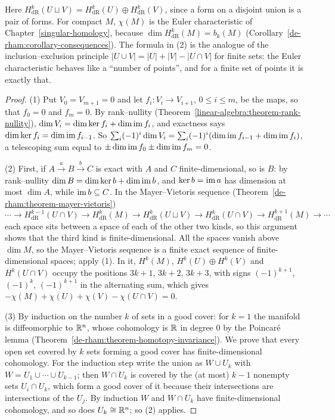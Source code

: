 Here $H^k_{\mathrm{dR}}(U \sqcup V) = H^k_{\mathrm{dR}}(U) \oplus H^k_{\mathrm{dR}}(V)$, since a form on a disjoint union is a pair of forms. For compact $M$, $\chi(M)$ is the Euler characteristic of
Chapter~\ref{singular-homology}, because $\dim H^k_{\mathrm{dR}}(M) = b_k(M)$ (Corollary~\ref{de-rham:corollary-consequences}). The formula in (2) is the analogue of the inclusion--exclusion principle
$|U \cup V| = |U| + |V| - |U \cap V|$ for finite sets: the Euler characteristic behaves like a ``number of points'', and for a finite set of points it is exactly that.

\begin{proof}
(1) Put $V_0 = V_{m+1} = 0$ and let $f_i \colon V_i \to V_{i+1}$, $0 \leq i \leq m$, be the maps, so that $f_0 = 0$ and $f_m = 0$. By rank--nullity (Theorem~\ref{linear-algebra:theorem-rank-nullity}), $\dim V_i = \dim\ker f_i + \dim\operatorname{im} f_i$, and exactness says
$\dim\ker f_i = \dim\operatorname{im} f_{i-1}$. So $\sum_i(-1)^i\dim V_i = \sum_i(-1)^i(\dim\operatorname{im} f_{i-1} + \dim\operatorname{im} f_i)$, a telescoping sum equal to $\pm\dim\operatorname{im} f_0 \pm \dim\operatorname{im} f_m = 0$.

(2) First, if $A \xrightarrow{a} B \xrightarrow{b} C$ is exact with $A$ and $C$ finite-dimensional, so is $B$: by rank--nullity $\dim B = \dim\ker b + \dim\operatorname{im} b$, and $\ker b = \operatorname{im} a$ has dimension at most $\dim A$,
while $\operatorname{im} b \subseteq C$. In the Mayer--Vietoris sequence (Theorem~\ref{de-rham:theorem-mayer-vietoris})
\[
\cdots \to H^{k-1}_{\mathrm{dR}}(U \cap V) \to H^k_{\mathrm{dR}}(M) \to H^k_{\mathrm{dR}}(U \sqcup V) \to H^k_{\mathrm{dR}}(U \cap V) \to H^{k+1}_{\mathrm{dR}}(M) \to \cdots
\]
each space sits between a space of each of the other two kinds, so this argument shows that the third kind is finite-dimensional. All the spaces vanish above $\dim M$, so the Mayer--Vietoris sequence is a finite exact
sequence of finite-dimensional spaces; apply (1). In it, $H^k(M)$, $H^k(U) \oplus H^k(V)$ and $H^k(U \cap V)$ occupy the positions $3k + 1$, $3k + 2$, $3k + 3$, with signs $(-1)^{k+1}$, $(-1)^k$, $(-1)^{k+1}$ in
the alternating sum, which gives $-\chi(M) + \chi(U) + \chi(V) - \chi(U \cap V) = 0$.

(3) By induction on the number $k$ of sets in a good cover: for $k = 1$ the manifold is diffeomorphic to $\mathbb{R}^n$, whose cohomology is $\mathbb{R}$ in degree $0$ by the Poincar\'e lemma
(Theorem~\ref{de-rham:theorem-homotopy-invariance}). We prove that every open set covered by $k$ sets forming a good cover has finite-dimensional cohomology. For the induction step write the union as $W \cup U_k$ with $W = U_1 \cup \cdots \cup U_{k-1}$; then
$W \cap U_k$ is covered by the (at most) $k - 1$ nonempty sets $U_i \cap U_k$, which form a good cover of it because their intersections are intersections of the $U_j$. By induction $W$ and $W \cap U_k$ have
finite-dimensional cohomology, and so does $U_k \cong \mathbb{R}^n$; so (2) applies.
\end{proof}

